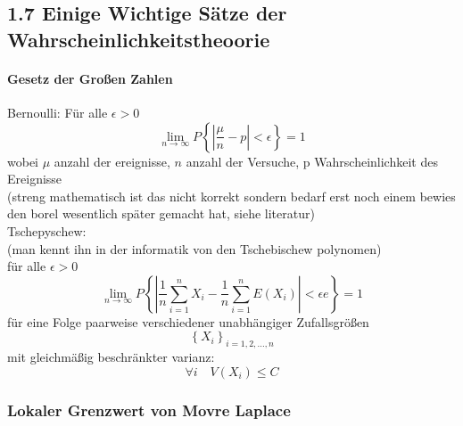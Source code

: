\documentclass[a4paper]{article}
\theoremstyle{definition}
\theoremstyle{remark}
\begin{document}
  \subsection{1.7 Einige Wichtige Sätze der Wahrscheinlichkeitstheoorie}
 \label{sub:1_7_einige_wichtige_satze_der_wahrscheinlichkeitstheoorie}
 
\paragraph{Gesetz  der Großen Zahlen}
\label{par:gesetz_der_grossen_zahlen}

Bernoulli: Für alle $\epsilon > 0 $ 
\begin{equation}
  \lim_{n \rightarrow \infty}P\left\{|\frac{\mu}{n}-p|<\epsilon \right\}=1
\end{equation}
 wobei $\mu$ anzahl der ereignisse, $n$ anzahl der Versuche, p Wahrscheinlichkeit des Ereignisse\\
 (streng mathematisch ist das nicht korrekt sondern bedarf erst noch einem bewies den borel wesentlich später gemacht hat, siehe literatur)\\
 Tschepyschew:\\
 (man kennt ihn in der informatik von den Tschebischew polynomen)\\
für alle $\epsilon >0$ 
\begin{equation}
  \lim_{n\rightarrow \infty}P\left\{ |\frac{1}{n}\sum_{i=1}^{n}X_i-\frac{1}{n}\sum_{i=1}^{n}E(X_i)|<\epsilon e \right\}=1
\end{equation}
für eine Folge paarweise verschiedener unabhängiger Zufallsgrößen
\begin{equation}
  \left\{ X_i \right\}_{i=1,2,\dots,n}
\end{equation}
mit gleichmäßig beschränkter varianz:
\begin{equation}
  \forall i \quad V(X_i)\leq C
\end{equation}
\subsubsection{Lokaler Grenzwert von Movre Laplace}
\label{ssub:lokaler_grenzwert_von_movre_laplace}
\end{document}
